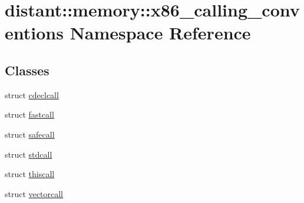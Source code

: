 \hypertarget{namespacedistant_1_1memory_1_1x86__calling__conventions}{}\section{distant\+:\+:memory\+:\+:x86\+\_\+calling\+\_\+conventions Namespace Reference}
\label{namespacedistant_1_1memory_1_1x86__calling__conventions}
\subsection*{Classes}
\begin{DoxyCompactItemize}
\item 
struct \mbox{\hyperlink{structdistant_1_1memory_1_1x86__calling__conventions_1_1cdeclcall}{cdeclcall}}
\item 
struct \mbox{\hyperlink{structdistant_1_1memory_1_1x86__calling__conventions_1_1fastcall}{fastcall}}
\item 
struct \mbox{\hyperlink{structdistant_1_1memory_1_1x86__calling__conventions_1_1safecall}{safecall}}
\item 
struct \mbox{\hyperlink{structdistant_1_1memory_1_1x86__calling__conventions_1_1stdcall}{stdcall}}
\item 
struct \mbox{\hyperlink{structdistant_1_1memory_1_1x86__calling__conventions_1_1thiscall}{thiscall}}
\item 
struct \mbox{\hyperlink{structdistant_1_1memory_1_1x86__calling__conventions_1_1vectorcall}{vectorcall}}
\end{DoxyCompactItemize}
